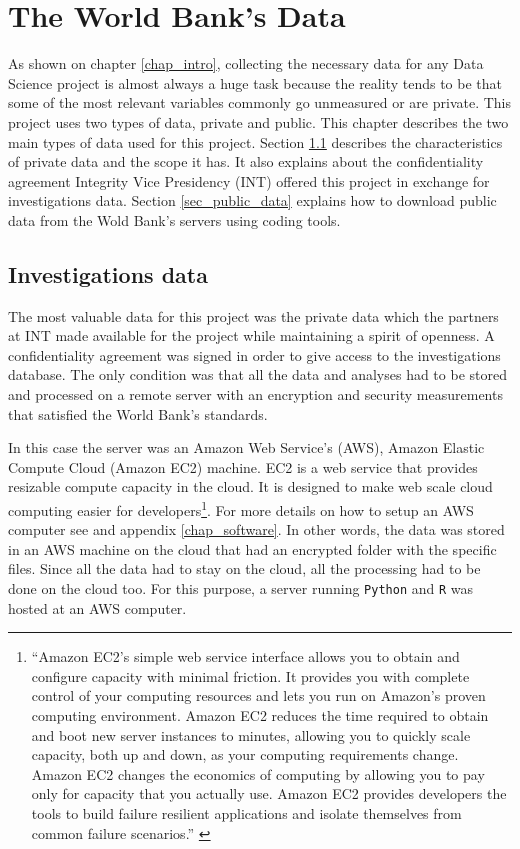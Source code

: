 \chapter{The World Bank's Data}\label{chap_data}

As shown on chapter \ref{chap_intro}, collecting the necessary data for any Data Science project is almost always a huge task because the reality tends to be that some of the most relevant variables commonly go unmeasured or are private. This project uses  two types of data, private and public. This chapter describes the two main types of data used for this project.
Section \ref{sec_inv_data} describes the characteristics of private data and the scope it has. It also explains about the confidentiality agreement Integrity Vice Presidency (INT) offered this project in exchange for investigations data. Section \ref{sec_public_data} explains how to download public data from the Wold Bank's servers using coding tools.

\section{Investigations data}\label{sec_inv_data}

The most valuable data for this project was the private data which the partners at INT made available for the project while maintaining a spirit of openness. A confidentiality agreement was signed in order to give access to the investigations database. The only condition was that all the data and analyses had to be stored and processed on a remote server with an encryption and security measurements that satisfied the World Bank's standards. 

In this case the server was an Amazon Web Service's (AWS), Amazon Elastic Compute Cloud (Amazon EC2) machine. EC2 is a web service that provides resizable compute capacity in the cloud. It is designed to make web scale cloud computing easier for developers\footnote{``Amazon EC2’s simple web service interface allows you to obtain and configure capacity with minimal friction. It provides you with complete control of your computing resources and lets you run on Amazon’s proven computing environment. Amazon EC2 reduces the time required to obtain and boot new server instances to minutes, allowing you to quickly scale capacity, both up and down, as your computing requirements change. Amazon EC2 changes the economics of computing by allowing you to pay only for capacity that you actually use. Amazon EC2 provides developers the tools to build failure resilient applications and isolate themselves from common failure scenarios.'' \parencite{aws_es2}}. For more details on how to setup an AWS computer see \parencite{aws_start} and appendix \ref{chap_software}. In other words, the data was stored in an AWS machine on the cloud that had an encrypted folder with the specific files. Since all the data had to stay on the cloud, all the processing had to be done on the cloud too. For this purpose, a server running \texttt{Python} and \texttt{R} was hosted at an AWS computer. 


